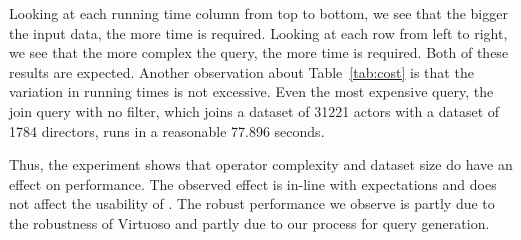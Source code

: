 Looking at each running time column from top to bottom, we see that the bigger the input data, the more time is required. Looking at each row from left to right, we see that the more complex the query, the more time is required. Both of these results are expected. Another observation about Table~\ref{tab:cost} is that the variation in running times is not excessive. Even the most expensive query, the join query with no filter, which joins a dataset of 31221 actors with a dataset of 1784 directors, runs in a reasonable 77.896 seconds.

Thus, the experiment shows that operator complexity and dataset size do have an effect on performance. The observed effect is in-line with expectations and does not affect the usability of \rdfframes. The robust performance we observe is partly due to the robustness of Virtuoso
and partly due to our process for \sparql query generation.
